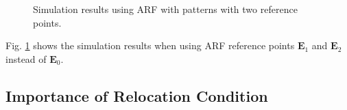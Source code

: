 \documentclass[a4paper,12pt]{book}
\begin{document}
\begin{figure}[h]
{\begin{tabular}{c}
  \end{tabular}
 }%
 \caption{Simulation results using ARF with patterns with two reference points.}
 \label{fig:res3}
\end{figure}

Fig. \ref{fig:res3} shows the simulation results when using ARF reference points $\bm{E}_1$ and $\bm{E}_2$ instead of $\bm{E}_0$.

\subsection{Importance of Relocation Condition}
\end{document}

